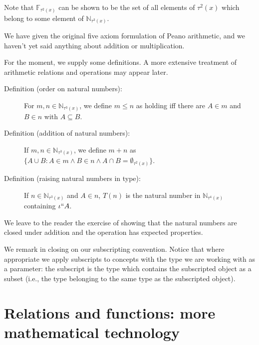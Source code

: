 \documentclass[12pt]{article}
\begin{document}
\begin{description}
\begin{enumerate}
\end{enumerate}

Note that $\mathbb F_{\tau^2(x)}$ can be shown to be the set of all elements of $\tau^2(x)$ which belong to some element of $\mathbb N_{\tau^3(x)}$.

We have given the original five axiom formulation of Peano arithmetic, and we haven't yet said anything about addition or multiplication.


For the moment, we supply some definitions.  A more extensive treatment of arithmetic relations and operations may appear later.

\begin{description}

\item[Definition (order on natural numbers):]  For $m,n \in \mathbb N_{\tau^3(x)}$, we define $m \leq n$ as holding iff
there are $A \in m$ and $B \in n$ with $A \subseteq B$.

\item[Definition (addition of natural numbers):]  If $m,n \in \mathbb N_{\tau^3(x)}$, we define $m+n$ as $\{A \cup B:A \in m \wedge B \in n \wedge A \cap B = \emptyset_{\tau^2(x)}\}$.

\item[Definition (raising natural numbers in type):]  If $n \in \mathbb N_{\tau^3(x)}$ and $A \in n$, $T(n)$ is the natural number in $\mathbb N_{\tau^4(x)}$ containing $\iota``A$.

\end{description}

We leave to the reader the exercise of showing that the natural numbers are closed under addition and the operation has expected properties.

We remark in closing on our subscripting convention.  Notice that where appropriate we apply subscripts to concepts
with the type we are working with as a parameter:  the subscript is the type which contains the subscripted object as a subset (i.e., the type belonging to the same type as the subscripted object).

\end{description}

\section{Relations and functions:  more mathematical technology}
\end{document}
